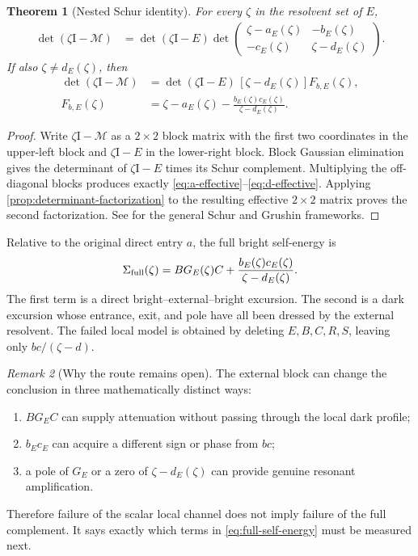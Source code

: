 \documentclass[11pt]{article}
\newtheorem{theorem}{Theorem}[section]
\theoremstyle{definition}
\theoremstyle{remark}
\newtheorem{remark}[theorem]{Remark}
\newcommand{\Id}{\mathrm I}
\newcommand{\cM}{\mathcal M}
\begin{document}
\begin{theorem}[Nested Schur identity]
\label{thm:nested-schur}
For every $\zeta$ in the resolvent set of $E$,
\begin{align}
 \det(\zeta\Id-\cM)
 &=\det(\zeta\Id-E)
 \det\begin{pmatrix}
 \zeta-a_E(\zeta)&-b_E(\zeta)\\
 -c_E(\zeta)&\zeta-d_E(\zeta)
 \end{pmatrix}.
 \label{eq:nested-determinant}
\end{align}
If also $\zeta\ne d_E(\zeta)$, then
\begin{align}
 \det(\zeta\Id-\cM)
 &=\det(\zeta\Id-E)\,[\zeta-d_E(\zeta)]
 F_{b,E}(\zeta),
 \label{eq:nested-scalar-factorization}\\
 F_{b,E}(\zeta)
 &=\zeta-a_E(\zeta)
 -\frac{b_E(\zeta)c_E(\zeta)}{\zeta-d_E(\zeta)}.
 \label{eq:nested-bright-function}
\end{align}
\end{theorem}

\begin{proof}
Write $\zeta\Id-\cM$ as a $2\times2$ block matrix with the first two
coordinates in the upper-left block and $\zeta\Id-E$ in the lower-right
block.  Block Gaussian elimination gives the determinant of
$\zeta\Id-E$ times its Schur complement.  Multiplying the off-diagonal
blocks produces exactly \eqref{eq:a-effective}--\eqref{eq:d-effective}.
Applying \cref{prop:determinant-factorization} to the resulting effective
$2\times2$ matrix proves the second factorization.  See
\citep{Zhang2005,HornJohnson2013,SjoestrandZworski2007} for the general Schur
and Grushin frameworks.
\end{proof}

Relative to the original direct entry $a$, the full bright self-energy is
\begin{equation}\label{eq:full-self-energy}
 \Sigma_{\rm full}(\zeta)
 =B G_E(\zeta)C
 +\frac{b_E(\zeta)c_E(\zeta)}{\zeta-d_E(\zeta)}.
\end{equation}
The first term is a direct bright--external--bright excursion.  The second
is a dark excursion whose entrance, exit, and pole have all been dressed by
the external resolvent.  The failed local model is obtained by deleting
$E,B,C,R,S$, leaving only $bc/(\zeta-d)$.

\begin{remark}[Why the route remains open]
The external block can change the conclusion in three mathematically
distinct ways:
\begin{enumerate}[label=(\roman*),leftmargin=2.4em]
 \item $B G_E C$ can supply attenuation without passing through the local
 dark profile;
 \item $b_Ec_E$ can acquire a different sign or phase from $bc$;
 \item a pole of $G_E$ or a zero of $\zeta-d_E(\zeta)$ can provide genuine
 resonant amplification.
\end{enumerate}
Therefore failure of the scalar local channel does not imply failure of
the full complement.  It says exactly which terms in
\eqref{eq:full-self-energy} must be measured next.
\end{remark}
\end{document}
